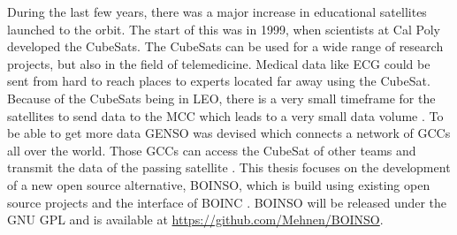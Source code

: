 During the last few years, there was a major increase in educational satellites launched to the orbit. The start of this was in 1999, when scientists at \acf{Cal Poly} developed the CubeSats.
\newline
The CubeSats can be used for a wide range of research projects, but also in the field of telemedicine. 
\newline
Medical data like ECG could be sent from hard to reach places to experts located far away using the CubeSat.
\newline
Because of the CubeSats being in \acf{LEO}, there is a very small timeframe for the satellites to send data to the \ac{MCC} which leads to a very small data volume \cite{preindl_optimization_2010}. To be able to get more data \acf{GENSO} was devised which connects a network of \acp{GCC} all over the world. Those \acp{GCC} can access the CubeSat of other  teams and transmit the data of the passing satellite \cite{leveque_global_2007}.
\newline
This thesis focuses on the development of a new open source alternative, \ac{BOINSO}, which is build using existing open source projects and the interface of \ac{BOINC} \cite{ries_boinc_2012}.
\newline
\ac{BOINSO} will be released under the \ac{GNU GPL} and is available at \url{https://github.com/Mehnen/BOINSO}.
